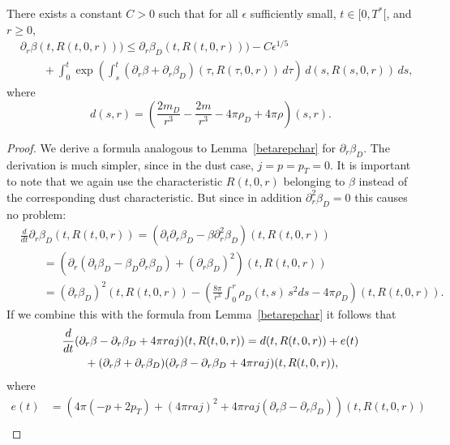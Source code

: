 \documentclass[11pt]{article}
\begin{document}
\begin{lemma}\label{betaprdifference}
  There exists a constant $C>0$ such that for all $\epsilon$ sufficiently small,
  $t\in [0,T^\ast[$, and $r\geq 0$,
  \begin{align*}
    &\partial_r\beta(t,R(t,0,r)))
    \leq
    \partial_r\beta_D(t,R(t,0,r))) - C \epsilon^{1/5} \\
    &\qquad
    +
    \int_0^t
    \exp\left(\int_s^t(\partial_r\beta + \partial_r \beta_D)(\tau,R(\tau,0,r))
    \,d\tau\right)\,
    d(s,R(s,0,r))\,ds,
  \end{align*}
  where
  \[
  d(s,r)
  = \left(\frac{2 m_D}{r^3}-\frac{2 m}{r^3}
  - 4\pi \rho_D + 4\pi \rho\right)(s,r).
  \]
\end{lemma}

\begin{proof}
  We derive a formula analogous to Lemma~\ref{betarepchar}
  for $\partial_r\beta_D$.
  The derivation is much simpler, since in the dust case, $j=p=p_T=0$. 
  It is important to note that we again use the characteristic $R(t,0,r)$
  belonging
  to $\beta$ instead of the corresponding dust characteristic. But since
  in addition $\partial_r^2\beta_D =0$ this causes no problem:
  \begin{align*}
    &
    \frac{d}{dt} \partial_r \beta_D (t,R(t,0,r))
    =\left(\partial_t\partial_r \beta_D - \beta \partial_r^2\beta_D\right)
    (t,R(t,0,r))\\
    & \qquad
    =\left(\partial_r\left(\partial_t \beta_D
    - \beta_D \partial_r\beta_D\right) +
    (\partial_r\beta_D)^2 \right) (t,R(t,0,r))\\
    & \qquad
    = (\partial_r\beta_D)^2 (t,R(t,0,r))
    - \left(\frac{8\pi}{r^3}\int_0^r \rho_D (t,s)\, s^2 ds
    - 4\pi \rho_D\right)(t,R(t,0,r)). 
  \end{align*}
  If we combine this with the formula from Lemma~\ref{betarepchar}
  it follows that
   \begin{align}\label{diffeqbetadiff}
    &
     \frac{d}{dt} (\partial_r \beta-\partial_r \beta_D +4\pi r a j)
     (t,R(t,0,r)) =
      d(t,R(t,0,r)) + e(t)\notag \\
     &\qquad
     {} + (\partial_r\beta + \partial_r \beta_D)
     (\partial_r\beta - \partial_r \beta_D +4\pi r a j)(t,R(t,0,r)),
   \end{align}
   where
   \begin{align*}
     e(t)
     & =   
     \left( 4 \pi (- p + 2 p_T) + (4 \pi r a j)^2 +
     4\pi r a j (\partial_r\beta-\partial_r\beta_D)\right)(t,R(t,0,r))\\

\end{align*}
\end{proof}
\end{document}
